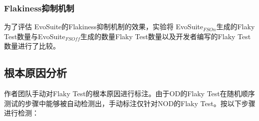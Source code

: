 \documentclass{article}
\newcommand{\flakyTest}{Flaky Test}
\begin{document}
\subsubsection{Flakiness抑制机制}

为了评估 EvoSuite的Flakiness抑制机制的效果，实验将
EvoSuite${}_{FSOn}$生成的\flakyTest 数量与EvoSuite${}_{FSOff}$生成的数量\flakyTest 数量以及开发者编写的\flakyTest 数量进行了比较。

\subsection{根本原因分析}

作者团队手动对\flakyTest 的根本原因进行标注。由于OD的\flakyTest 在随机顺序测试的步骤中能够被自动检测出，手动标注仅针对NOD的\flakyTest。按以下步骤进行检测：
\end{document}
